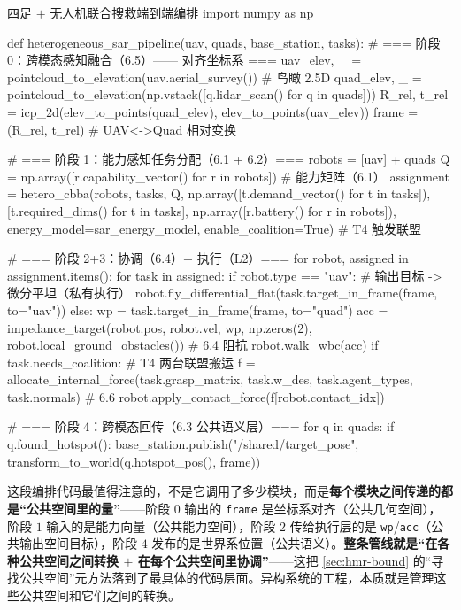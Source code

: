 \begin{codebox}[Python]{四足 $+$ 无人机联合搜救端到端编排}
import numpy as np

def heterogeneous_sar_pipeline(uav, quads, base_station, tasks):
    # === 阶段 0：跨模态感知融合（6.5）—— 对齐坐标系 ===
    uav_elev, _ = pointcloud_to_elevation(uav.aerial_survey())          # 鸟瞰 2.5D
    quad_elev, _ = pointcloud_to_elevation(np.vstack([q.lidar_scan() for q in quads]))
    R_rel, t_rel = icp_2d(elev_to_points(quad_elev), elev_to_points(uav_elev))
    frame = (R_rel, t_rel)                                              # UAV<->Quad 相对变换

    # === 阶段 1：能力感知任务分配（6.1 + 6.2）===
    robots = [uav] + quads
    Q = np.array([r.capability_vector() for r in robots])              # 能力矩阵（6.1）
    assignment = hetero_cbba(robots, tasks, Q,
                             np.array([t.demand_vector() for t in tasks]),
                             [t.required_dims() for t in tasks],
                             np.array([r.battery() for r in robots]),
                             energy_model=sar_energy_model, enable_coalition=True)  # T4 触发联盟

    # === 阶段 2+3：协调（6.4）+ 执行（L2）===
    for robot, assigned in assignment.items():
        for task in assigned:
            if robot.type == "uav":                                   # 输出目标 -> 微分平坦（私有执行）
                robot.fly_differential_flat(task.target_in_frame(frame, to="uav"))
            else:
                wp = task.target_in_frame(frame, to="quad")
                acc = impedance_target(robot.pos, robot.vel, wp, np.zeros(2),
                                       robot.local_ground_obstacles())  # 6.4 阻抗
                robot.walk_wbc(acc)
                if task.needs_coalition:                              # T4 两台联盟搬运
                    f = allocate_internal_force(task.grasp_matrix, task.w_des,
                                                task.agent_types, task.normals)  # 6.6
                    robot.apply_contact_force(f[robot.contact_idx])

    # === 阶段 4：跨模态回传（6.3 公共语义层）===
    for q in quads:
        if q.found_hotspot():
            base_station.publish("/shared/target_pose",
                                 transform_to_world(q.hotspot_pos(), frame))
\end{codebox}

\begin{insight}
这段编排代码最值得注意的，不是它调用了多少模块，而是\textbf{每个模块之间传递的都是“公共空间里的量”}——阶段 $0$ 输出的 \texttt{frame} 是坐标系对齐（公共几何空间），阶段 $1$ 输入的是能力向量（公共能力空间），阶段 $2$ 传给执行层的是 \texttt{wp}/\texttt{acc}（公共输出空间目标），阶段 $4$ 发布的是世界系位置（公共语义）。\textbf{整条管线就是“在各种公共空间之间转换 $+$ 在每个公共空间里协调”}——这把 \cref{sec:hmr-bound} 的“寻找公共空间”元方法落到了最具体的代码层面。异构系统的工程，本质就是管理这些公共空间和它们之间的转换。
\end{insight}

